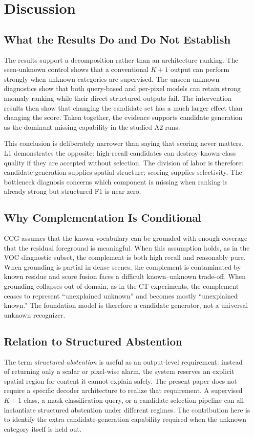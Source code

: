 \documentclass[journal]{IEEEtai}
\newcommand{\CCG}{\textsc{CCG}\xspace}
\begin{document}
\FloatBarrier
\section{Discussion}
\label{sec:discussion}

\subsection{What the Results Do and Do Not Establish}
The results support a decomposition rather than an architecture ranking. The seen-unknown control shows that a conventional $K{+}1$ output can perform strongly when unknown categories are supervised. The unseen-unknown diagnostics show that both query-based and per-pixel models can retain strong anomaly ranking while their direct structured outputs fail. The intervention results then show that changing the candidate set has a much larger effect than changing the score. Taken together, the evidence supports candidate generation as the dominant missing capability in the studied A2 runs.

This conclusion is deliberately narrower than saying that scoring never matters. L1 demonstrates the opposite: high-recall candidates can destroy known-class quality if they are accepted without selection. The division of labor is therefore: candidate generation supplies spatial structure; scoring supplies selectivity. The bottleneck diagnosis concerns which component is missing when ranking is already strong but structured F1 is near zero.

\subsection{Why Complementation Is Conditional}
\CCG assumes that the known vocabulary can be grounded with enough coverage that the residual foreground is meaningful. When this assumption holds, as in the VOC diagnostic subset, the complement is both high recall and reasonably pure. When grounding is partial in dense scenes, the complement is contaminated by known residue and score fusion faces a difficult known--unknown trade-off. When grounding collapses out of domain, as in the CT experiments, the complement ceases to represent ``unexplained unknown'' and becomes mostly ``unexplained known.'' The foundation model is therefore a candidate generator, not a universal unknown recognizer.

\subsection{Relation to Structured Abstention}
The term \emph{structured abstention} is useful as an output-level requirement: instead of returning only a scalar or pixel-wise alarm, the system reserves an explicit spatial region for content it cannot explain safely. The present paper does not require a specific decoder architecture to realize that requirement. A supervised $K{+}1$ class, a mask-classification query, or a candidate-selection pipeline can all instantiate structured abstention under different regimes. The contribution here is to identify the extra candidate-generation capability required when the unknown category itself is held out.
\end{document}
